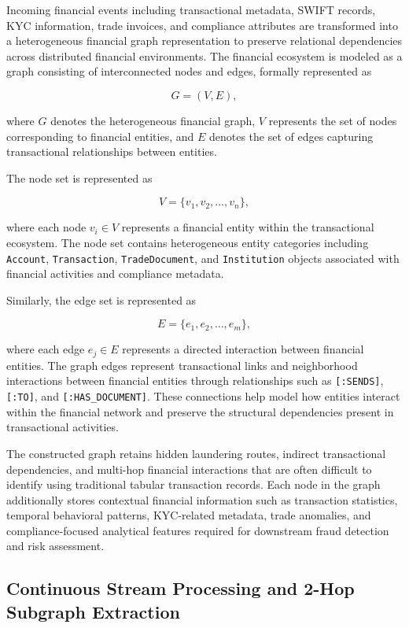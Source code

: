 \documentclass[conference]{IEEEtran}
\begin{document}
Incoming financial events including transactional metadata, SWIFT records, KYC information, trade invoices, and compliance attributes are transformed into a heterogeneous financial graph representation to preserve relational dependencies across distributed financial environments. The financial ecosystem is modeled as a graph consisting of interconnected nodes and edges, formally represented as

\[
G = (V,E),
\]

where \(G\) denotes the heterogeneous financial graph, \(V\) represents the set of nodes corresponding to financial entities, and \(E\) denotes the set of edges capturing transactional relationships between entities.

The node set is represented as

\[
V = \{v_1, v_2, \dots, v_n\},
\]

where each node \(v_i \in V\) represents a financial entity within the transactional ecosystem. The node set contains heterogeneous entity categories including \texttt{Account}, \texttt{Transaction}, \texttt{TradeDocument}, and \texttt{Institution} objects associated with financial activities and compliance metadata.

Similarly, the edge set is represented as

\[
E = \{e_1, e_2, \dots, e_m\},
\]

where each edge \(e_j \in E\) represents a directed interaction between financial entities. The graph edges represent transactional links and neighborhood interactions between financial entities through relationships such as \texttt{[:SENDS]}, \texttt{[:TO]}, and \texttt{[:HAS\_DOCUMENT]}. These connections help model how entities interact within the financial network and preserve the structural dependencies present in transactional activities.

The constructed graph retains hidden laundering routes, indirect transactional dependencies, and multi-hop financial interactions that are often difficult to identify using traditional tabular transaction records. Each node in the graph additionally stores contextual financial information such as transaction statistics, temporal behavioral patterns, KYC-related metadata, trade anomalies, and compliance-focused analytical features required for downstream fraud detection and risk assessment.

\subsection{\textbf{Continuous Stream Processing and 2-Hop Subgraph Extraction}}
\end{document}

